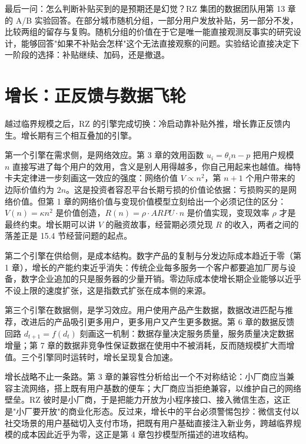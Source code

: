 最后一问：怎么判断补贴买到的是预期还是幻觉？RZ 集团的数据团队用第 13 章的 A/B 实验回答。在部分城市随机分组，一部分用户发放补贴，另一部分不发，比较两组的留存与复购。随机分组的价值在于它是唯一能直接观测反事实的研究设计，能够回答"如果不补贴会怎样"这个无法直接观察的问题。实验结论直接决定下一阶段的选择：补贴继续、加码，还是撤退。

\section{增长：正反馈与数据飞轮}

越过临界规模之后，RZ 的引擎完成切换：冷启动靠补贴外推，增长靠正反馈内生。增长期有三个相互叠加的引擎。

第一个引擎在需求侧，是网络效应。第 3 章的效用函数 $u_i=\theta_i n-p$ 把用户规模 $n$ 直接写进了每个用户的效用，含义是别人用得越多，你自己用起来也越值。梅特卡夫定律进一步刻画这一效应的强度：网络价值 $V\propto n^{2}$，第 $n+1$ 个用户带来的边际价值约为 $2n$。这是投资者容忍平台长期亏损的价值论依据：亏损购买的是网络价值。但第 1 章的网络价值与变现价值模型立刻给出一个必须记住的区分：$V(n)=\kappa n^{2}$ 是价值创造，$R(n)=\rho\cdot ARPU\cdot n$ 是价值实现，变现效率 $\rho$ 才是最终约束。增长期可以讲 $V$ 的融资故事，经营期必须兑现 $R$ 的收入，两者之间的落差正是 15.4 节经营问题的起点。

第二个引擎在供给侧，是成本结构。数字产品的复制与分发边际成本趋近于零（第 1 章），增长的产能约束近乎消失：传统企业每多服务一个客户都要追加厂房与设备，数字企业追加的只是服务器的少量开销。零边际成本使增长期企业能够以近乎不设上限的速度扩张，这是指数式扩张在成本侧的来源。

第三个引擎在数据侧，是学习效应。用户使用产品产生数据，数据改进匹配与推荐，改进后的产品吸引更多用户，更多用户又产生更多数据。第 6 章的数据反馈回路 $d_{t+1}=f(d_t)$ 刻画这一机制：数据存量决定服务质量，服务质量决定数据增量；第 7 章的数据非竞争性保证数据在使用中不被消耗，反而随规模扩大而增值。三个引擎同时运转时，增长呈现复合加速。

增长战略不止一条路。第 3 章的兼容性分析给出一个不对称结论：小厂商应当兼容主流网络，搭上既有用户基数的便车；大厂商应当拒绝兼容，以维护自己的网络壁垒。RZ 彼时是小厂商，于是把能力开放为小程序接口、接入微信生态，这正是"小厂要开放"的商业化形态。反过来，增长中的平台必须警惕包抄：微信支付以社交场景的用户基础切入支付市场，把既有用户基础直接注入新业务，跨越临界规模的成本因此近乎为零，这正是第 4 章包抄模型所描述的进攻结构。

